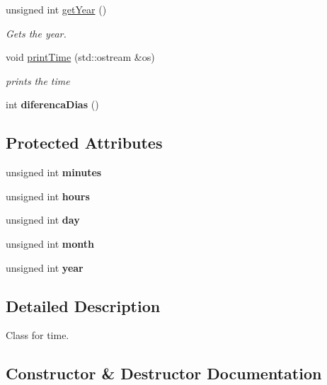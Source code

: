 \begin{DoxyCompactItemize}
unsigned int \hyperlink{classTime_ade4d01d38041bb86a2e1ded9fd3cd28e}{get\+Year} ()
\begin{DoxyCompactList}\small\item\em Gets the year. \end{DoxyCompactList}\item 
void \hyperlink{classTime_a79d96e150ff808580fdf43932897130d}{print\+Time} (std\+::ostream \&os)
\begin{DoxyCompactList}\small\item\em prints the time \end{DoxyCompactList}\item 
\mbox{\label{classTime_a346c1dbc706dfd41e4a15b16577e4265}} 
int {\bfseries diferenca\+Dias} ()
\end{DoxyCompactItemize}
\subsection*{Protected Attributes}
\begin{DoxyCompactItemize}
\item 
\mbox{\label{classTime_ab9da5c3324d296464bf26131fd5d8c3f}} 
unsigned int {\bfseries minutes}
\item 
\mbox{\label{classTime_a08e7d6202b1fe8c01c25bf6688d41712}} 
unsigned int {\bfseries hours}
\item 
\mbox{\label{classTime_a9e8b7d2c0e22ab2b87a5870d0492e508}} 
unsigned int {\bfseries day}
\item 
\mbox{\label{classTime_a6076ed85da3f1d76e8c5d014ae239748}} 
unsigned int {\bfseries month}
\item 
\mbox{\label{classTime_ae2f1e52f8d00060a7cf7376927d65994}} 
unsigned int {\bfseries year}
\end{DoxyCompactItemize}


\subsection{Detailed Description}
Class for time. 

\subsection{Constructor \& Destructor Documentation}
\mbox{\label{classTime_a355bb7292c28e01866289e1119f457a9}} 
